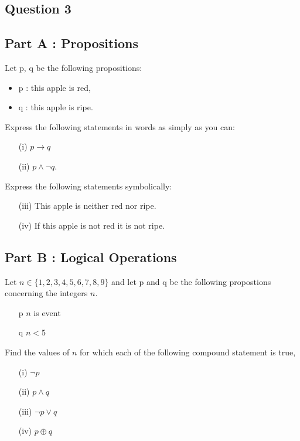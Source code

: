 \documentclass[]{report}
\begin{document}
\begin{enumerate}
\section*{Question 3}
\subsection*{Part A : Propositions}
Let p, q be the following propositions:
\begin{itemize}
\item p : this apple is red, 
\item q : this apple is ripe.
\end{itemize}

\noindent Express the following statements in words as simply as you can:
\begin{itemize}
\item[(i)] $p \rightarrow q$
\item[(ii)] $p \wedge \neg q$.
\end{itemize}

\noindent Express the following statements symbolically:
\begin{itemize}
\item[(iii)] This apple is neither red nor ripe.
\item[(iv)] If this apple is not red it is not ripe.
\end{itemize}

\subsection*{Part B : Logical Operations}
Let $n \in \{1,2,3,4,5,6,7,8,9\}$ and let p and q be the following propostions concerning 
the integers $n$.

\begin{itemize}
\item[p] $n$ is event
\item[q] $n<5$
\end{itemize}

Find the values of $n$ for which each of the following compound statement is true,

\begin{itemize}
\item[(i)] $\neg p$
\item[(ii)] $p \wedge q$
\item[(iii)] $\neg p \vee q$ 
\item[(iv)] $p \oplus q$
\end{itemize}


\end{enumerate}
\end{document}
